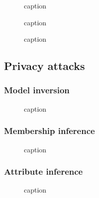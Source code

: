 \documentclass[11pt]{article}
\begin{document}
\begin{figure}[H]
    \centering
    \caption{caption}
\end{figure}

\begin{figure}[H]
    \centering
    \caption{caption}
\end{figure}

\begin{figure}[H]
    \centering
    \caption{caption}
\end{figure}

\subsection{Privacy attacks}

\subsubsection{Model inversion}

\begin{figure}[H]
    \centering
    \caption{caption}
\end{figure}

\subsubsection{Membership inference}

\begin{figure}[H]
    \centering
    \caption{caption}
\end{figure}

\subsubsection{Attribute inference}

\begin{figure}[H]
    \centering
    \caption{caption}
\end{figure}
\end{document}
